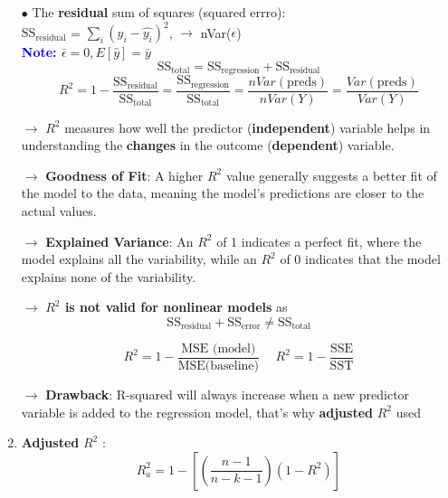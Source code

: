\documentclass[letterpaper, 10.5pt,landscape]{article}
\begin{document}
\begin{multicols*}{3}
\begin{enumerate}[leftmargin=4mm]
    $\bullet$ The \textbf{residual} sum of squares (squared errro): \\ 
    $\text{SS}_{\text{residual}}$ = \(\sum_{i} (y_{i} - \hat{y_{i}})^{2} \), $\rightarrow$ nVar($\epsilon$) \\
    
    \vspace{2pt}
    \textbf{\textcolor{blue}{Note: }} \(\bar{\epsilon} = 0, E[\hat{y}] = \bar{y} \)
    \vspace{-3pt}
    \[\text{SS}_{\text{total}} = \text{SS}_{\text{regression}} + \text{SS}_{\text{residual}} \]
    \vspace{-3pt}
    \[R^{2} = 1 - \frac{\text{SS}_{\text{residual}}}{\text{SS}_{\text{total}}} = \frac{\text{SS}_{\text{regression}}}{\text{SS}_{\text{total}}} = \frac{nVar(\text{preds})}{nVar(Y)} = \frac{Var(\text{preds})}{Var(Y)}\]
    \vspace{-3pt}
    
    $\rightarrow$ $R^{2}$ measures how well the predictor (\textbf{independent}) variable helps in understanding the \textbf{changes} in the outcome (\textbf{dependent}) variable. 
    
    
    $\rightarrow$ \textbf{Goodness of Fit}: A higher $R^{2}$
    value generally suggests a better fit of the model to the data, meaning the model's predictions are closer to the actual values. 
    
    
    $\rightarrow$  \textbf{Explained Variance}: An $R^{2}$ of 1 indicates a perfect fit, where the model explains all the variability, while an $R^{2}$ of 0 indicates that the model explains none of the variability.
    
    $\rightarrow$ \textbf{$R^{2}$ is not valid for nonlinear models} as 
    \vspace{-2pt}
    \[\boxed{\text{SS}_{\text{residual}} + \text{SS}_{\text{error}} \neq \text{SS}_{\text{total}}}\]
    \vspace{-3pt}

    \vspace{-4pt}
    \[\boxed{R^{2} = 1 - \frac{\text{MSE (model)}}{\text{MSE(baseline)}}} \hspace{15pt} \boxed{R^{2} = 1 - \frac{\text{SSE}}{\text{SST}}} \] 
    
    $\rightarrow$ \textbf{Drawback}: R-squared will always increase when a new predictor variable is added to the regression model, that's why \textbf{adjusted} $R^{2}$ used

    
    \item \textbf{Adjusted} $R^{2}$ :
    \vspace{-3pt}
    \[\boxed{R^{2}_{a} =  1 - \left[ \left( \frac{n-1}{n-k-1} \right) (1-R^{2})   \right]} \] 






\end{enumerate}
\end{multicols*}
\end{document}
